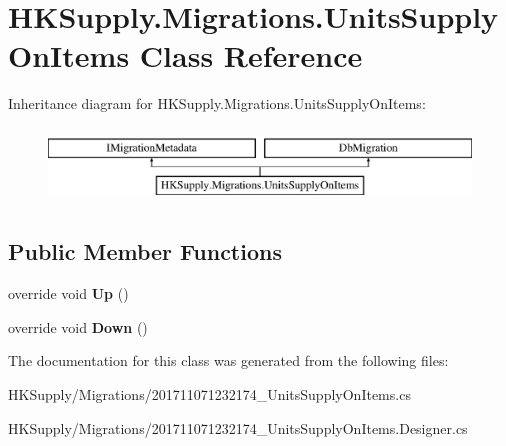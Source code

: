 \hypertarget{class_h_k_supply_1_1_migrations_1_1_units_supply_on_items}{}\section{H\+K\+Supply.\+Migrations.\+Units\+Supply\+On\+Items Class Reference}
\label{class_h_k_supply_1_1_migrations_1_1_units_supply_on_items}
Inheritance diagram for H\+K\+Supply.\+Migrations.\+Units\+Supply\+On\+Items\+:\begin{figure}[H]
\begin{center}
\leavevmode
\includegraphics[height=2.000000cm]{class_h_k_supply_1_1_migrations_1_1_units_supply_on_items}
\end{center}
\end{figure}
\subsection*{Public Member Functions}
\begin{DoxyCompactItemize}
\item 
\mbox{\label{class_h_k_supply_1_1_migrations_1_1_units_supply_on_items_a5ca2f1d15fd877a628802b7c14d11242}} 
override void {\bfseries Up} ()
\item 
\mbox{\label{class_h_k_supply_1_1_migrations_1_1_units_supply_on_items_a06603f7d95debe67b4105fbd5ccf241f}} 
override void {\bfseries Down} ()
\end{DoxyCompactItemize}


The documentation for this class was generated from the following files\+:\begin{DoxyCompactItemize}
\item 
H\+K\+Supply/\+Migrations/201711071232174\+\_\+\+Units\+Supply\+On\+Items.\+cs\item 
H\+K\+Supply/\+Migrations/201711071232174\+\_\+\+Units\+Supply\+On\+Items.\+Designer.\+cs\end{DoxyCompactItemize}
